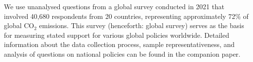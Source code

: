 \begin{bibunit}


We use unanalysed questions from a global survey conducted in 2021 that involved 40,680 respondents from 20 countries, representing approximately 72\% of global CO$_\text{2}$ emissions. 
This survey (henceforth: global survey) serves as the basis for measuring stated support for various global policies worldwide. 
Detailed information about the data collection process, sample representativeness, and analysis of questions on national policies can be found in the companion paper.\cite{dechezlepretre_fighting_nodate}


\end{bibunit}
